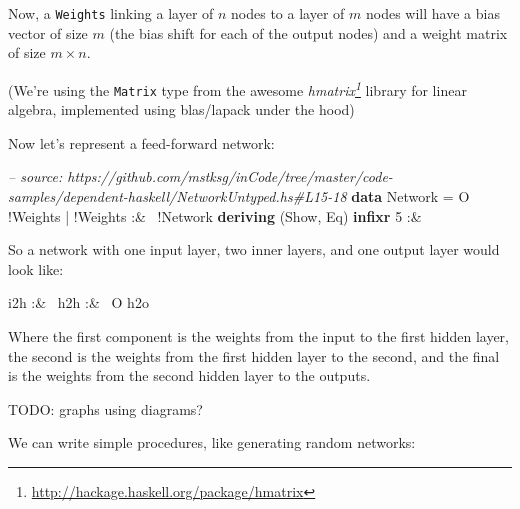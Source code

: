\documentclass[]{article}
\newenvironment{Shaded}{}{}
\newcommand{\KeywordTok}[1]{\textcolor[rgb]{0.00,0.44,0.13}{\textbf{{#1}}}}
\newcommand{\DataTypeTok}[1]{\textcolor[rgb]{0.56,0.13,0.00}{{#1}}}
\newcommand{\DecValTok}[1]{\textcolor[rgb]{0.25,0.63,0.44}{{#1}}}
\newcommand{\CommentTok}[1]{\textcolor[rgb]{0.38,0.63,0.69}{\textit{{#1}}}}
\newcommand{\FunctionTok}[1]{\textcolor[rgb]{0.02,0.16,0.49}{{#1}}}
\newcommand{\NormalTok}[1]{{#1}}
\renewcommand{\href}[2]{#2\footnote{\url{#1}}}
\begin{document}
Now, a \texttt{Weights} linking a layer of \(n\) nodes to a layer of
\(m\) nodes will have a bias vector of size \(m\) (the bias shift for
each of the output nodes) and a weight matrix of size \(m \times n\).

(We're using the \texttt{Matrix} type from the awesome
\emph{\href{http://hackage.haskell.org/package/hmatrix}{hmatrix}}
library for linear algebra, implemented using blas/lapack under the
hood)

Now let's represent a feed-forward network:

\begin{Shaded}
\begin{Highlighting}[]
\CommentTok{-- source: https://github.com/mstksg/inCode/tree/master/code-samples/dependent-haskell/NetworkUntyped.hs#L15-18}
\KeywordTok{data} \DataTypeTok{Network} \FunctionTok{=} \DataTypeTok{O} \FunctionTok{!}\DataTypeTok{Weights}
             \FunctionTok{|} \FunctionTok{!}\DataTypeTok{Weights} \FunctionTok{:&~} \FunctionTok{!}\DataTypeTok{Network}
  \KeywordTok{deriving} \NormalTok{(}\DataTypeTok{Show}\NormalTok{, }\DataTypeTok{Eq}\NormalTok{)}
\KeywordTok{infixr} \DecValTok{5} \FunctionTok{:&~}
\end{Highlighting}
\end{Shaded}

So a network with one input layer, two inner layers, and one output
layer would look like:

\begin{Shaded}
\begin{Highlighting}[]
\NormalTok{i2h }\FunctionTok{:&~} \NormalTok{h2h }\FunctionTok{:&~} \DataTypeTok{O} \NormalTok{h2o}
\end{Highlighting}
\end{Shaded}

Where the first component is the weights from the input to the first
hidden layer, the second is the weights from the first hidden layer to
the second, and the final is the weights from the second hidden layer to
the outputs.

TODO: graphs using diagrams?

We can write simple procedures, like generating random networks:
\end{document}
